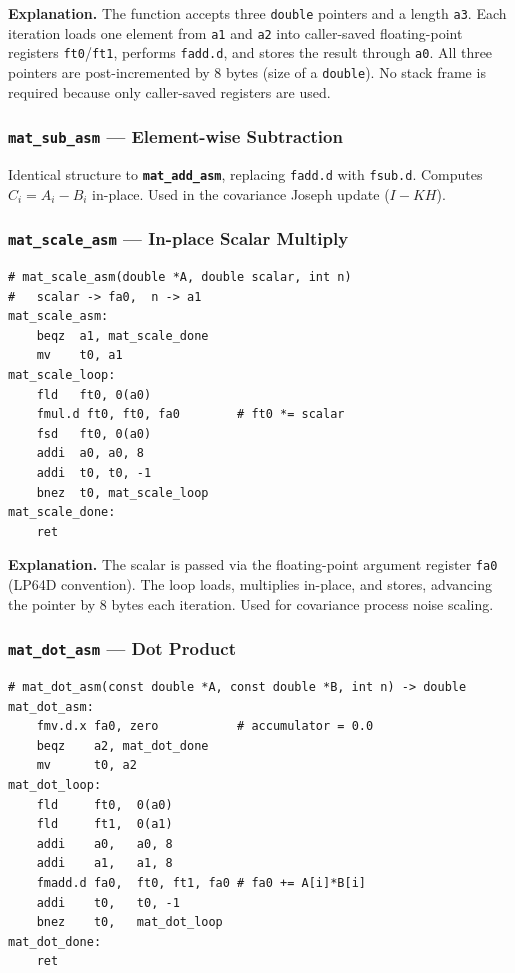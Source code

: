 \documentclass[12pt,a4paper]{article}
\newcommand{\reg}[1]{\texttt{\color{reg}#1}}
\newcommand{\insn}[1]{\texttt{\color{keyword}#1}}
\newcommand{\func}[1]{\texttt{\bfseries #1}}
\begin{document}
\textbf{Explanation.}
The function accepts three \texttt{double} pointers and a length \reg{a3}.
Each iteration loads one element from \reg{a1} and \reg{a2} into
caller-saved floating-point registers \reg{ft0}/\reg{ft1},
performs \insn{fadd.d}, and stores the result through \reg{a0}.
All three pointers are post-incremented by 8 bytes (size of a
\texttt{double}). No stack frame is required because only
caller-saved registers are used.

\subsubsection{\func{mat\_sub\_asm} --- Element-wise Subtraction}

Identical structure to \func{mat\_add\_asm}, replacing \insn{fadd.d}
with \insn{fsub.d}. Computes $C_i = A_i - B_i$ in-place. Used in the
covariance Joseph update ($I - KH$).

\subsubsection{\func{mat\_scale\_asm} --- In-place Scalar Multiply}

\begin{lstlisting}[caption={\func{mat\_scale\_asm}: A[i] *= scalar},label=lst:matscale]
# mat_scale_asm(double *A, double scalar, int n)
#   scalar -> fa0,  n -> a1
mat_scale_asm:
    beqz  a1, mat_scale_done
    mv    t0, a1
mat_scale_loop:
    fld   ft0, 0(a0)
    fmul.d ft0, ft0, fa0        # ft0 *= scalar
    fsd   ft0, 0(a0)
    addi  a0, a0, 8
    addi  t0, t0, -1
    bnez  t0, mat_scale_loop
mat_scale_done:
    ret
\end{lstlisting}

\textbf{Explanation.}
The scalar is passed via the floating-point argument register \reg{fa0}
(LP64D convention). The loop loads, multiplies in-place, and stores,
advancing the pointer by 8 bytes each iteration. Used for covariance
process noise scaling.

\subsubsection{\func{mat\_dot\_asm} --- Dot Product}

\begin{lstlisting}[caption={\func{mat\_dot\_asm}: $\sum A_i B_i$, result in fa0},label=lst:matdot]
# mat_dot_asm(const double *A, const double *B, int n) -> double
mat_dot_asm:
    fmv.d.x fa0, zero           # accumulator = 0.0
    beqz    a2, mat_dot_done
    mv      t0, a2
mat_dot_loop:
    fld     ft0,  0(a0)
    fld     ft1,  0(a1)
    addi    a0,   a0, 8
    addi    a1,   a1, 8
    fmadd.d fa0,  ft0, ft1, fa0 # fa0 += A[i]*B[i]
    addi    t0,   t0, -1
    bnez    t0,   mat_dot_loop
mat_dot_done:
    ret
\end{lstlisting}
\end{document}
